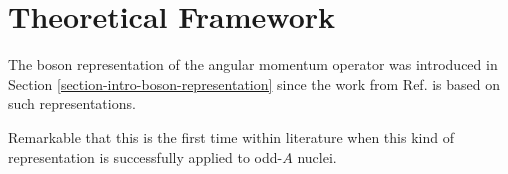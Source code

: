 \section{Theoretical Framework}
\label{section-new-boson-theoretical-framework}

The boson representation of the angular momentum operator was introduced in Section \ref{section-intro-boson-representation} since the work from Ref. \cite{raduta2020new} is based on such representations. 


Remarkable that this is the first time within literature when this kind of representation is successfully applied to odd-$A$ nuclei.